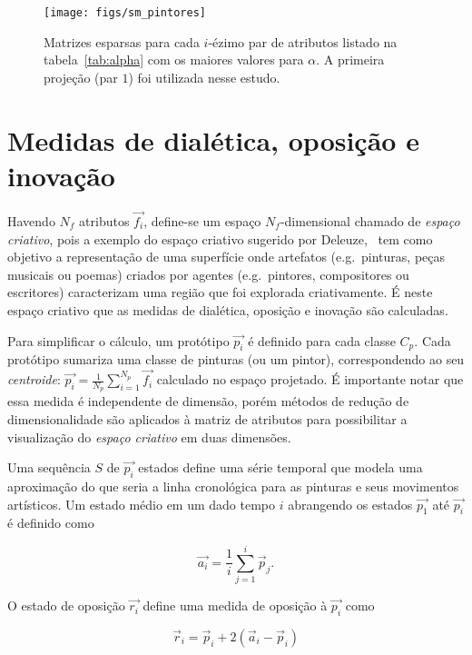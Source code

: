 \begin{figure}[h!]
\begin{center}
      \caption{Matrizes esparsas para cada $i$-ézimo par de atributos listado na
        tabela~\ref{tab:alpha} com os maiores valores para $\alpha$. A primeira
        projeção (par $1$) foi utilizada nesse estudo.}
        \label{fig:scatters}
        \end{center}
{    \centering
        \texttt{[image: figs/sm\_pintores]}}
        \fonteminha
\end{figure}
\clearpage
\section{Medidas de dialética, oposição e inovação}
\label{sec:medidas}

Havendo $N_f$ atributos $\vec{f_i}$, define-se um espaço
$N_f$-dimensional chamado de \textit{espaço criativo}, pois a exemplo
do espaço criativo sugerido por Deleuze,~\cite{deleuze} tem como
objetivo a representação de uma superfície onde artefatos
(e.g.\ pinturas, peças musicais ou poemas) criados por agentes
(e.g.\ pintores, compositores ou escritores) caracterizam uma região que
foi explorada criativamente. É neste espaço criativo que as medidas de
dialética, oposição e inovação são calculadas.~\cite{vieira}

Para simplificar o cálculo, um protótipo $\vec{p_i}$ é definido para cada classe
$C_p$. Cada protótipo sumariza uma classe de pinturas (ou um pintor),
correspondendo ao seu \textit{centroide}: $\vec{p_i} = \frac{1}{N_p}
\sum_{i=1}^{N_p} \vec{f_i}$ calculado no espaço projetado. É importante notar
que essa medida é independente de dimensão, porém métodos de redução de
dimensionalidade são aplicados à matriz de atributos para possibilitar a
visualização do \textit{espaço criativo} em duas dimensões.

Uma sequência $S$ de $\vec{p_i}$ estados define uma série temporal que
modela uma aproximação do que seria a linha cronológica para as
pinturas e seus movimentos artísticos. Um estado médio em um dado
tempo $i$ abrangendo os estados $\vec{p_1}$ até $\vec{p_i}$ é definido
como

\begin{equation}
\vec{a_i} = \frac{1}{i}\sum_{j=1}^i\vec{p}_j.
\end{equation}

O estado de oposição $\vec{r_i}$ define uma medida de oposição à $\vec{p_i}$ como

\begin{equation}
\vec{r}_i = \vec{p}_i + 2(\vec{a}_i - \vec{p}_i)
\end{equation}

